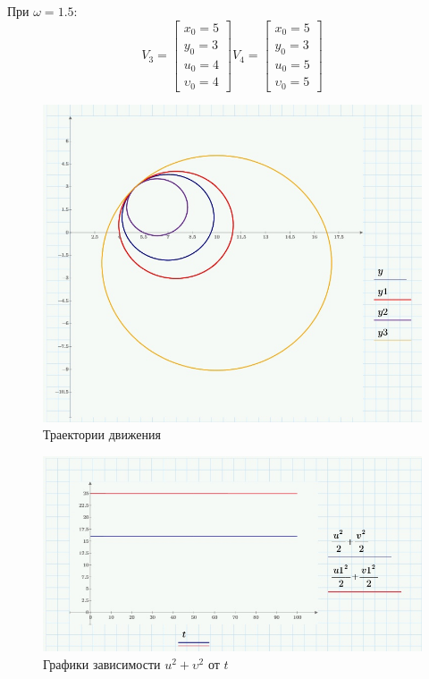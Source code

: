 \documentclass[a4paper, 14pt]{extarticle}
\begin{document}
		При $\omega = 1.5$:
		\[
			V_3 = \begin{bmatrix}x_0=5\\y_0=3\\u_0=4\\\upsilon_0=4\end{bmatrix}
			V_4 = \begin{bmatrix}x_0=5\\y_0=3\\u_0=5\\\upsilon_0=5\end{bmatrix}
		\]
		\begin{figure}[H]
			\centering
			\includegraphics[width = \linewidth]{1.jpg}
			\caption{Траектории движения}
		\end{figure}
		\begin{figure}[H]
			\centering
			\includegraphics[width = \linewidth]{2.jpg}
			\caption{Графики зависимости $u^2+\upsilon^2$ от $t$}
		\end{figure}
\end{document}
